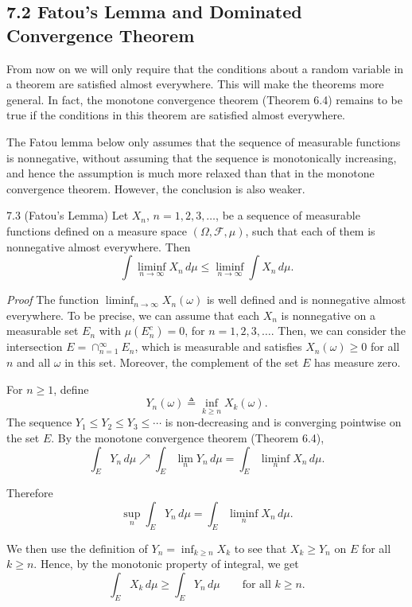 \subsection*{7.2 Fatou's Lemma and Dominated Convergence Theorem}

From now on we will only require that the conditions about a random variable in a theorem are satisfied almost everywhere. This will make the theorems more general. In fact, the monotone convergence theorem (Theorem 6.4) remains to be true if the conditions in this theorem are satisfied almost everywhere.

The Fatou lemma below only assumes that the sequence of measurable functions is nonnegative, without assuming that the sequence is monotonically increasing, and hence the assumption is much more relaxed than that in the monotone convergence theorem. However, the conclusion is also weaker.

\begin{thmbox}{7.3 (Fatou's Lemma)}
Let $X_n$, $n=1,2,3,\dots$, be a sequence of measurable functions defined on a measure space $(\Omega,\mathcal{F},\mu)$, such that each of them is nonnegative almost everywhere. Then
\[
\int \liminf_{n\to\infty} X_n\, d\mu \le \liminf_{n\to\infty} \int X_n\, d\mu.
\]
\end{thmbox}

\textit{Proof} The function $\liminf_{n\to\infty} X_n(\omega)$ is well defined and is nonnegative almost everywhere. To be precise, we can assume that each $X_n$ is nonnegative on a measurable set $E_n$ with $\mu(E_n^c)=0$, for $n=1,2,3,\dots$. Then, we can consider the intersection $E=\cap_{n=1}^{\infty} E_n$, which is measurable and satisfies $X_n(\omega)\ge 0$ for all $n$ and all $\omega$ in this set. Moreover, the complement of the set $E$ has measure zero.

For $n\ge 1$, define
\[
Y_n(\omega)\triangleq \inf_{k\ge n} X_k(\omega).
\]
The sequence $Y_1 \le Y_2 \le Y_3 \le \cdots$ is non-decreasing and is converging pointwise on the set $E$. By the monotone convergence theorem (Theorem 6.4),
\[
\int_E Y_n\, d\mu \nearrow \int_E \lim_n Y_n\, d\mu = \int_E \liminf_n X_n\, d\mu.
\]

Therefore
\begin{equation}
\sup_n \int_E Y_n\, d\mu = \int_E \liminf_n X_n\, d\mu.
\tag{7.1}
\end{equation}

We then use the definition of $Y_n=\inf_{k\ge n} X_k$ to see that $X_k\ge Y_n$ on $E$ for all $k\ge n$. Hence, by the monotonic property of integral, we get
\[
\int_E X_k\, d\mu \ge \int_E Y_n\, d\mu \qquad \text{for all } k\ge n.
\]


